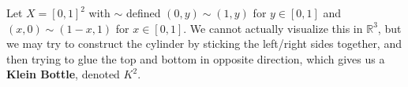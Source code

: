     \begin{example}
      Let $X = [0, 1]^2$ with $\sim$ defined $(0, y) \sim (1, y)$ for $y \in [0, 1]$ and $(x, 0) \sim (1 - x, 1)$ for $x \in [0, 1]$. We cannot actually visualize this in $\mathbb{R}^3$, but we may try to construct the cylinder by sticking the left/right sides together, and then trying to glue the top and bottom in opposite direction, which gives us a \textbf{Klein Bottle}, denoted $K^2$. 

      \begin{figure}[H]
        \centering
        \begin{subfigure}[b]{0.48\textwidth}
          \centering
\end{subfigure}
\end{figure}
\end{example}
